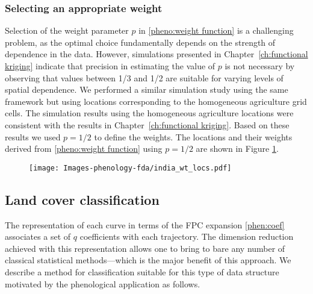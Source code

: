 \subsubsection{Selecting an appropriate weight} 

\label{sub:selecting_an_appropriate_weight} 
Selection of the weight parameter $p$ in \eqref{pheno:weight function} is a challenging problem, as the optimal choice fundamentally depends on the strength of dependence in the data. However, simulations presented in Chapter~\ref{ch:functional kriging} indicate that precision in estimating the value of $p$ is not necessary by observing that values between 1/3 and 1/2 are suitable for varying levels of spatial dependence. We performed a similar simulation study using the same framework but using locations corresponding to the homogeneous agriculture grid cells. The simulation results using the homogeneous agriculture locations were consistent with the results in Chapter~\ref{ch:functional kriging}. Based on these results we used $p=1/2$ to define the weights. The locations and their weights derived from \eqref{pheno:weight function} using $p=1/2$ are shown in Figure \ref{fig:india weighted locs}. 
\begin{figure}
	[h] \centering 
	\texttt{[image: Images-phenology-fda/india\_wt\_locs.pdf]}  \label{fig:india weighted locs} 
\end{figure}


\subsection{Land cover classification} 
\label{sub:land_cover_classification}

The representation of each curve in terms of the FPC expansion \eqref{phen:coef} associates a set of $q$ coefficients with each trajectory. The dimension reduction achieved with this representation allows one to bring to bare any number of classical statistical methods---which is the major benefit of this approach. We describe a method for classification suitable for this type of data structure motivated by the phenological application as follows.


